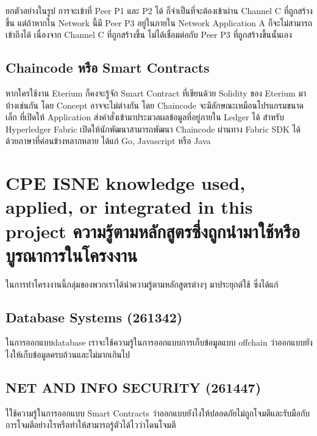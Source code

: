 ยกตัวอย่างในรูป การจะเข้าที่ Peer P1 และ P2 ได้ ก็จำเป็นที่จะต้องเข้าผ่าน Channel C ที่ถูกสร้างขึ้น แต่ถ้าหากใน Network นี้มี Peer P3 อยู่ในภายใน Network Application A ก็จะไม่สามารถเข้าถึงได้ เนื่องจาก Channel C ที่ถูกสร้างขึ้น ไม่ได้เชื่อมต่อกับ Peer P3 ที่ถูกสร้างขึ้นนั้นเอง

\subsection{Chaincode หรือ Smart Contracts}
\cite{Hyperledger_a} 
หากใครใช้งาน Eterium ก็คงจะรู้จัก Smart Contract ที่เขียนด้วย Solidity ของ Eterium มาบ้างเช่นกัน โดย Concept อาจจะไม่ต่างกัน โดย Chaincode จะมีลักษณะเหมือนโปรแกรมขนาดเล็ก ที่เปิดให้ Application ส่งคำสั่งเข้ามาประมวลผลข้อมูลที่อยู่ภายใน Ledger ได้ สำหรับ Hyperledger Fabric เปิดให้นักพัฒนาสามารถพัฒนา Chaincode ผ่านทาง Fabric SDK ได้ด้วยภาษาที่ค่อนข้างหลากหลาย ได้แก่ Go, Javascript หรือ Java

\section{\ifenglish%
\ifcpe CPE \else ISNE \fi knowledge used, applied, or integrated in this project
\else%
ความรู้ตามหลักสูตรซึ่งถูกนำมาใช้หรือบูรณาการในโครงงาน
\fi
}
\enskip \enskip \enskip \enskip \enskip ในการทำโครงงานนี้กลุ่มของพวกเราได้นำความรู้ตามหลักสูตรต่างๆ มาประยุกต์ใช้ ซึ่งได้แก่
\enskip \enskip \enskip \enskip \enskip 
\subsection{Database Systems (261342) }
ในการออกแบบdatabase เราจะใช้ความรู้ในการออกแบบการเก็บข้อมูลแบบ offchain ว่าออกแบบยังไงให้เก็บข้อมูลครบถ้วนและไม่มากเกินไป

\subsection{NET AND INFO SECURITY (261447) }
ใใช้ความรู้ในการออกแบบ Smart Contracts ว่าออกแบบยังไงให้ปลอดภัยไม่ถูกโจมตีและรับมือกับการโจมตีอย่างไรหรือทำให้สามารถรู้ตัวได้ไวว่าโดนโจมตี





